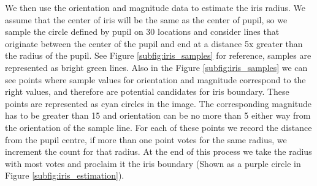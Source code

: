We then use the orientation and magnitude data to estimate the iris radius. We assume that the center of iris will be the same as the center of pupil, so we sample the circle defined by pupil on 30 locations and consider lines that originate between the center of the pupil and end at a distance 5x greater than the radius of the pupil. See Figure \ref{subfig:iris_samples} for reference, samples are represented as bright green lines. 
Also in the Figure \ref{subfig:iris_samples} we can see points where sample values for orientation and magnitude correspond to the right values, and therefore are potential candidates for iris boundary. These points are represented as cyan circles in the image. The corresponding magnitude has to be greater than 15 and orientation can be no more than  5 either way from the orientation of the sample line. For each of these points we record the distance from the pupil centre, if more than one point votes for the same radius, we increment the count for that radius. At the end of this process we take the radius with most votes and proclaim it the iris boundary (Shown as a purple circle in Figure \ref{subfig:iris_estimation}).

